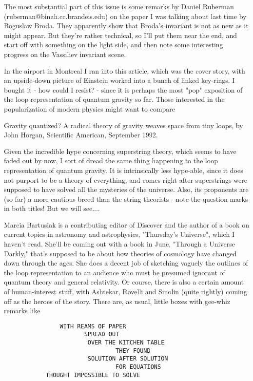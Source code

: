
The most substantial part of this issue is some remarks by Daniel Ruberman (ruberman@binah.cc.brandeis.edu) on the paper I was talking about last time by Boguslaw Broda. They apparently show that Broda's invariant is not as new as it might appear. But they're rather technical, so I'll put them near the end, and start off with something on the light side, and then note some interesting progress on the Vassiliev invariant scene.


In the airport in Montreal I ran into this article, which was the cover story, with an upside-down picture of Einstein worked into a bunch of linked key-rings. I bought it - how could I resist? - since it is perhaps the most "pop" exposition of the loop representation of quantum gravity so far. Those interested in the popularization of modern physics might want to compare

Gravity quantized? A radical theory of gravity weaves space from tiny loops, by John Horgan, Scientific American, September 1992.

Given the incredible hype concerning superstring theory, which seems to have faded out by now, I sort of dread the same thing happening to the loop representation of quantum gravity. It is intrinsically less hype-able, since it does not purport to be a theory of everything, and comes right after superstrings were supposed to have solved all the mysteries of the universe. Also, its proponents are (so far) a more cautious breed than the string theorists - note the question marks in both titles! But we will see....

Marcia Bartusiak is a contributing editor of Discover and the author of a book on current topics in astronomy and astrophysics, "Thursday's Universe", which I haven't read. She'll be coming out with a book in June, "Through a Universe Darkly," that's supposed to be about how theories of cosmology have changed down through the ages. She does a decent job of sketching vaguely the outlines of the loop representation to an audience who must be presumed ignorant of quantum theory and general relativity. Or course, there is also a certain amount of human-interest stuff, with Ashtekar, Rovelli and Smolin (quite rightly) coming off as the heroes of the story. There are, as usual, little boxes with gee-whiz remarks like
\begin{verbatim}
                WITH REAMS OF PAPER
            	       SPREAD OUT
		                OVER THE KITCHEN TABLE
			                    THEY FOUND
		                SOLUTION AFTER SOLUTION
			                    FOR EQUATIONS
            THOUGHT IMPOSSIBLE TO SOLVE
\end{verbatim}
			

